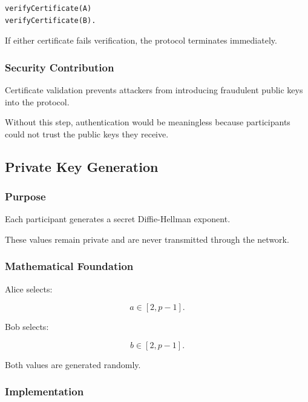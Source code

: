 \documentclass[12pt]{article}
\begin{document}
\begin{verbatim}
verifyCertificate(A)
verifyCertificate(B).
\end{verbatim}

If either certificate fails verification, the protocol terminates immediately.

\subsubsection{Security Contribution}

Certificate validation prevents attackers from introducing fraudulent public
keys into the protocol.

Without this step, authentication would be meaningless because participants
could not trust the public keys they receive.


\subsection{Private Key Generation}

\subsubsection{Purpose}

Each participant generates a secret Diffie-Hellman exponent.

These values remain private and are never transmitted through the network.

\subsubsection{Mathematical Foundation}

Alice selects:

\begin{equation}
a \in [2,p-1].
\end{equation}

Bob selects:

\begin{equation}
b \in [2,p-1].
\end{equation}

Both values are generated randomly.

\subsubsection{Implementation}
\end{document}
